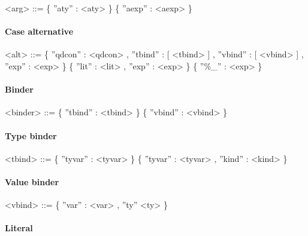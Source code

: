 \begin{scriptsize}
\begin{grammar}
<arg>		  ::= 	 \{ ''aty'' : <aty> \}											 
		  \alt 	 \{ ''aexp'' : <aexp> \}										


\end{grammar}

\paragraph{Case alternative}
\begin{grammar}

<alt>		  ::= 	 \{ ''qdcon'' : <qdcon> , ''tbind'' : [ <tbind> ] , ''vbind'' : [ <vbind> ] , ''exp'' : <exp> \}
		  \alt 			 \{ ''lit'' : <lit> , ''exp'' : <exp> \}
		  \alt 			 \{ ''\%\_'' : <exp> \}	


\end{grammar}

\paragraph{Binder}

\begin{grammar}

<binder>	  ::= 	\{ ''tbind'' : <tbind> \}		
		  \alt 	\{ ''vbind'' : <vbind> \}	


\end{grammar}

\paragraph{Type binder}

\begin{grammar}

<tbind>		  ::= 	 \{ ''tyvar'' : <tyvar> \}
		  \alt 	 \{ ''tyvar'' : <tyvar> , ''kind'' : <kind> \}	


\end{grammar}

\paragraph{Value binder}

\begin{grammar}

<vbind>		  ::= 	 \{ ''var'' : <var> , ''ty'' <ty> \} 										 

\end{grammar}

\paragraph{Literal}


\end{scriptsize}
